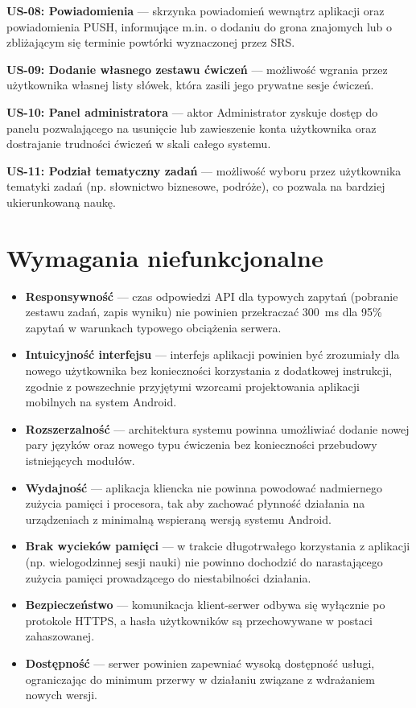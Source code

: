 \documentclass[polish]{aghengthesis}
\begin{document}
\textbf{US-08: Powiadomienia} — skrzynka powiadomień wewnątrz aplikacji
oraz powiadomienia PUSH, informujące m.in. o dodaniu do grona znajomych lub
o zbliżającym się terminie powtórki wyznaczonej przez SRS.

\textbf{US-09: Dodanie własnego zestawu ćwiczeń} — możliwość wgrania przez
użytkownika własnej listy słówek, która zasili jego prywatne sesje ćwiczeń.

\textbf{US-10: Panel administratora} — aktor Administrator zyskuje dostęp
do panelu pozwalającego na usunięcie lub zawieszenie konta użytkownika oraz
dostrajanie trudności ćwiczeń w skali całego systemu.

\textbf{US-11: Podział tematyczny zadań} — możliwość wyboru przez
użytkownika tematyki zadań (np. słownictwo biznesowe, podróże), co pozwala
na bardziej ukierunkowaną naukę.

\section{Wymagania niefunkcjonalne}
\begin{itemize}
    \item \textbf{Responsywność} — czas odpowiedzi API dla typowych
    zapytań (pobranie zestawu zadań, zapis wyniku) nie powinien przekraczać
    300~ms dla 95\% zapytań w warunkach typowego obciążenia serwera.
    \item \textbf{Intuicyjność interfejsu} — interfejs aplikacji powinien
    być zrozumiały dla nowego użytkownika bez konieczności korzystania
    z dodatkowej instrukcji, zgodnie z powszechnie przyjętymi wzorcami
    projektowania aplikacji mobilnych na system Android.
    \item \textbf{Rozszerzalność} — architektura systemu powinna umożliwiać
    dodanie nowej pary języków oraz nowego typu ćwiczenia bez konieczności
    przebudowy istniejących modułów.
    \item \textbf{Wydajność} — aplikacja kliencka nie powinna powodować
    nadmiernego zużycia pamięci i procesora, tak aby zachować płynność
    działania na urządzeniach z minimalną wspieraną wersją systemu Android.
    \item \textbf{Brak wycieków pamięci} — w trakcie długotrwałego
    korzystania z aplikacji (np. wielogodzinnej sesji nauki) nie powinno
    dochodzić do narastającego zużycia pamięci prowadzącego do
    niestabilności działania.
    \item \textbf{Bezpieczeństwo} — komunikacja klient-serwer odbywa się
    wyłącznie po protokole HTTPS, a hasła użytkowników są przechowywane
    w postaci zahaszowanej.
    \item \textbf{Dostępność} — serwer powinien zapewniać wysoką
    dostępność usługi, ograniczając do minimum przerwy w działaniu
    związane z wdrażaniem nowych wersji.
\end{itemize}
\end{document}
